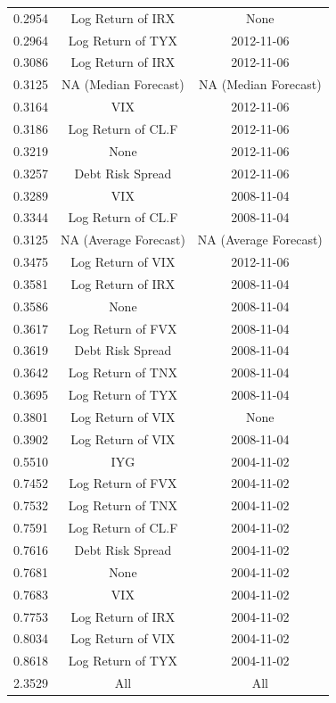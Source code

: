 \documentclass[11pt,3p,review,authoryear]{elsarticle}
\theoremstyle{definition}
\begin{document}
\begin{table}[ht]
\begin{tabular}{ccc}
  0.2954 & Log Return of IRX & None \\ 
  0.2964 & Log Return of TYX & 2012-11-06 \\ 
  0.3086 & Log Return of IRX & 2012-11-06 \\ 
  \rowcolor{gray}0.3125 & NA (Median Forecast) & NA (Median Forecast)\\
  0.3164 & VIX & 2012-11-06 \\ 
  0.3186 & Log Return of CL.F & 2012-11-06 \\ 
  0.3219 & None & 2012-11-06 \\ 
  0.3257 & Debt Risk Spread & 2012-11-06 \\ 
  0.3289 & VIX & 2008-11-04 \\ 
  0.3344 & Log Return of CL.F & 2008-11-04 \\ 
  \rowcolor{gray}0.3125 & NA (Average Forecast) & NA (Average Forecast)\\
  0.3475 & Log Return of VIX & 2012-11-06 \\ 
  0.3581 & Log Return of IRX & 2008-11-04 \\ 
  0.3586 & None & 2008-11-04 \\ 
  0.3617 & Log Return of FVX & 2008-11-04 \\ 
  0.3619 & Debt Risk Spread & 2008-11-04 \\ 
  0.3642 & Log Return of TNX & 2008-11-04 \\ 
  0.3695 & Log Return of TYX & 2008-11-04 \\ 
  0.3801 & Log Return of VIX & None \\ 
  0.3902 & Log Return of VIX & 2008-11-04 \\ 
  0.5510 & IYG & 2004-11-02 \\ 
  0.7452 & Log Return of FVX & 2004-11-02 \\ 
  0.7532 & Log Return of TNX & 2004-11-02 \\ 
  0.7591 & Log Return of CL.F & 2004-11-02 \\ 
  0.7616 & Debt Risk Spread & 2004-11-02 \\ 
  0.7681 & None & 2004-11-02 \\ 
  0.7683 & VIX & 2004-11-02 \\ 
  0.7753 & Log Return of IRX & 2004-11-02 \\ 
  0.8034 & Log Return of VIX & 2004-11-02 \\ 
  0.8618 & Log Return of TYX & 2004-11-02 \\ 
      \rowcolor{red} 2.3529 & All & All \\
       \hline
    \end{tabular}
    
    \endgroup
    \end{table}
\end{document}
